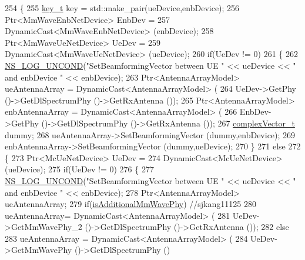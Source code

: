 \begin{DoxyCode}
254 \{
255         \hyperlink{namespacens3_aa42bd408e172586b3b192acfaa36b070}{key\_t} key = std::make\_pair(ueDevice,enbDevice);
256         Ptr<MmWaveEnbNetDevice> EnbDev =
257                                 DynamicCast<MmWaveEnbNetDevice> (enbDevice);
258         Ptr<MmWaveUeNetDevice> UeDev =
259                                 DynamicCast<MmWaveUeNetDevice> (ueDevice);
260         \textcolor{keywordflow}{if}(UeDev != 0)
261         \{
262                 \hyperlink{log-macros-disabled_8h_a0b36e5e182b37194f85ef1c5e979fb2e}{NS\_LOG\_UNCOND}(\textcolor{stringliteral}{"SetBeamformingVector between UE "} << ueDevice << \textcolor{stringliteral}{" and
       enbDevice "} << enbDevice);
263                 Ptr<AntennaArrayModel> ueAntennaArray = DynamicCast<AntennaArrayModel> (
264                                 UeDev->GetPhy ()->GetDlSpectrumPhy ()->GetRxAntenna ());
265                 Ptr<AntennaArrayModel> enbAntennaArray = DynamicCast<AntennaArrayModel> (
266                                 EnbDev->GetPhy ()->GetDlSpectrumPhy ()->GetRxAntenna ());
267                 \hyperlink{namespacens3_a6a7f75817ae50e6ac47414955b17d926}{complexVector\_t} dummy;
268                 ueAntennaArray->SetBeamformingVector (dummy,enbDevice);
269                 enbAntennaArray->SetBeamformingVector (dummy,ueDevice);
270         \}
271         \textcolor{keywordflow}{else}
272         \{
273                 Ptr<McUeNetDevice> UeDev =
274                                 DynamicCast<McUeNetDevice> (ueDevice);
275                 \textcolor{keywordflow}{if}(UeDev != 0)
276                 \{
277                         \hyperlink{log-macros-disabled_8h_a0b36e5e182b37194f85ef1c5e979fb2e}{NS\_LOG\_UNCOND}(\textcolor{stringliteral}{"SetBeamformingVector between UE "} << ueDevice << \textcolor{stringliteral}{" and
       enbDevice "} << enbDevice);
278                         Ptr<AntennaArrayModel> ueAntennaArray;
279                         \textcolor{keywordflow}{if}(\hyperlink{classns3_1_1MmWave3gppChannel_a5b921c4b6e89174bf383382c1ce6523f}{isAdditionalMmWavePhy}) \textcolor{comment}{//sjkang11125}
280                          ueAntennaArray= DynamicCast<AntennaArrayModel> (
281                                         UeDev->GetMmWavePhy\_2 ()->GetDlSpectrumPhy ()->GetRxAntenna ());
282                         \textcolor{keywordflow}{else}
283                                 ueAntennaArray = DynamicCast<AntennaArrayModel> (
284                                                                 UeDev->GetMmWavePhy ()->GetDlSpectrumPhy ()

\end{DoxyCode}
